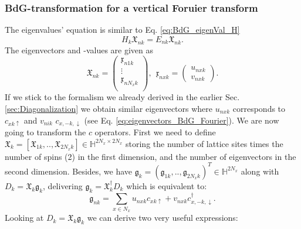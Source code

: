 \documentclass[../main.tex]{subfile}
\begin{document}
\subsubsection{BdG-transformation for a vertical Foruier transform}
The eigenvalues' equation is similar to Eq. \ref{eq:BdG_eigenVal_H}
\begin{equation}\label{eq:BdG_eigenVal_H_k}
    H_k \mathfrak{X}_{nk} = E_{nk} \mathfrak{X}_{nk}.
\end{equation}
The eigenvectors and -values are given as
\begin{equation*}
    \mathfrak{X}_{nk} = \begin{pmatrix}
        \mathfrak{x}_{n1k}\\
        \vdots\\
        \mathfrak{x}_{nN_xk}\\
    \end{pmatrix},~~ \mathfrak{x}_{nxk} = \begin{pmatrix}
        u_{nxk}\\
        v_{nxk}
    \end{pmatrix}.
\end{equation*}
If we stick to the formalism we already derived in the earlier Sec. \ref{sec:Diagonalization} we obtain similar 
eigenvectors where $u_{nxk}$ corresponds to $c_{xk\uparrow}$ and $v_{nik}$  $c_{x,-k,\downarrow}$ (see Eq. \ref{eq:eigenvectors_BdG_Fourier}). We are now going to transform the $c$ operators. First we need
to define $\mathfrak{X}_k = [\mathfrak{X}_{1k}, ..,\mathfrak{X}_{2N_xk}]\in\mathbb{H}^{2N_x\times 2N_x}$ storing the number of 
lattice sites times the number of spins (2) in the first dimension, and 
the number of eigenvectors in the second dimension. Besides, we have $\mathfrak{g}_k = (\mathfrak{g}_{1k}, .., \mathfrak{g}_{2N_xk})^T\in\mathbb{H}^{2N_x}$ along with $D_{k} = \mathfrak{X}_k\mathfrak{g}_k$,
delivering $\mathfrak{g}_k = \mathfrak{X}^{\dagger}_k D_{k}$ which is equivalent to:
\begin{equation}\label{eq:eigenvectors_BdG_Fourier}
    \mathfrak{g}_{nk} = \sum_{x\in{N_x}} u_{nxk}c_{xk\uparrow} + v_{nxk}c^{\dagger}_{x,-k,\downarrow}.
\end{equation}
Looking at $D_{k} = \mathfrak{X}_k\mathfrak{g}_k$ we can derive two very useful expressions:
\end{document}
